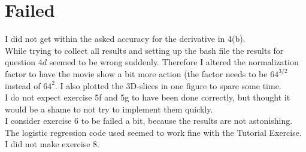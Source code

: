 \section{Failed}
I did not get within the asked accuracy for the derivative in 4(b).\\
While trying to collect all results and setting up the bash file the results for question $4d$ seemed to be wrong suddenly. Therefore I altered the normalization factor to have the movie show a bit more action (the factor needs to be $64^{3/2}$ instead of $64^2$. I also plotted the 3D-slices in one figure to spare some time.\\
I do not expect exercise 5f and 5g to have been done correctly, but thought it would be a shame to not try to implement them quickly.\\
I consider exercise 6 to be failed a bit, because the results are not astonishing. The logistic regression code used seemed to work fine with the Tutorial Exercise.\\
I did not make exercise 8.\\